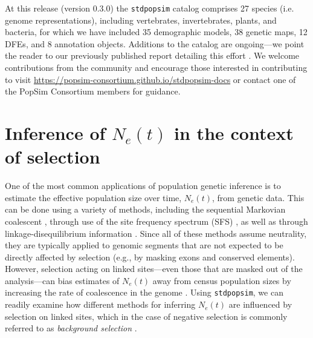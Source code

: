 \documentclass[hidelinks]{article}
\newcommand{\stdpopsim}{\texttt{stdpopsim}\xspace}
\begin{document}
    At this release (version 0.3.0) the \stdpopsim catalog comprises 27 species (i.e. genome representations),
    including vertebrates, invertebrates, plants, and bacteria,
    for which we have included 35 demographic models, 38 genetic maps, 12 DFEs, and 8 annotation objects. %
    Additions to the catalog are ongoing---we point the reader to our previously published
    report detailing this effort \citep{lauterbur2023expanding}. We welcome contributions from the
    community and encourage those interested in contributing to visit \url{https://popsim-consortium.github.io/stdpopsim-docs}
    or contact one of the PopSim Consortium members for guidance.



    \section*{Inference of $N_e(t)$ in the context of selection}
    One of the most common applications of population genetic inference is to estimate
    the effective population size over time, $N_e(t)$, from genetic data. This can be done
    using a variety of methods, including the sequential Markovian coalescent
    \citep{li2011inference,Schiffels2020,terhorst2017robust},
    through use of the site frequency spectrum (SFS) \citep{liu2020stairway},
    as well as through linkage-disequilibrium information \citep{santiago2020recent}.
    Since all of these methods assume neutrality, they are typically applied to genomic
    segments that are not expected to be directly affected by selection (e.g., by masking exons
    and conserved elements).
    However, selection acting on linked sites---even those that are masked out of the
    analysis---can bias estimates of $N_e(t)$
    away from census population sizes by increasing the
    rate of coalescence in the genome \citep[e.g.][]{schrider2016effects}.
    Using \stdpopsim, we can readily examine how different methods for inferring $N_e(t)$
    are influenced by selection on linked sites,
    which in the case of negative selection is commonly referred to as \emph{background selection}
    \citep{charlesworth1993effect,hudson1995deleterious}.
\end{document}
